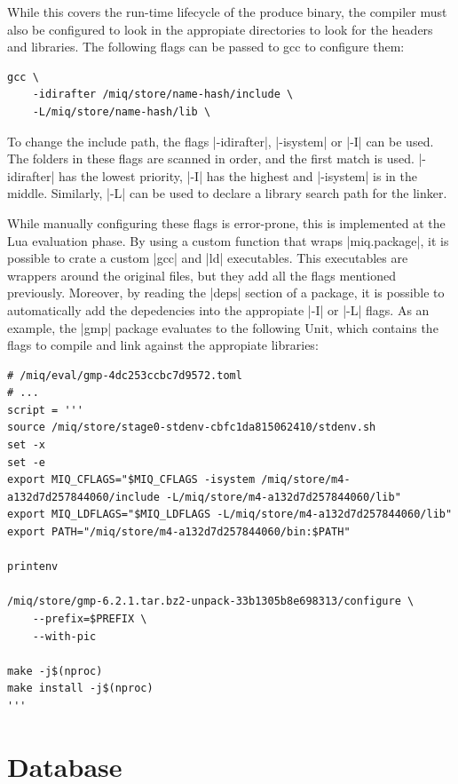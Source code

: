 While this covers the run-time lifecycle of the produce
binary, the compiler must also be configured to look in the
appropiate directories to look for the headers and
libraries. The following flags can be passed to gcc to
configure them:

\begin{verbatim}
gcc \
    -idirafter /miq/store/name-hash/include \
    -L/miq/store/name-hash/lib \
\end{verbatim}

To change the include path, the flags |-idirafter|,
|-isystem| or |-I| can be used. The folders in these flags
are scanned in order, and the first match is used.
|-idirafter| has the lowest priority, |-I| has the highest
and |-isystem| is in the middle.
Similarly, |-L| can be used to declare a library search path
for the linker.

While manually configuring these flags is error-prone, this
is implemented at the Lua evaluation phase. By using a
custom function that wraps |miq.package|, it is possible to
crate a custom |gcc| and |ld| executables. This executables
are wrappers around the original files, but they add all the
flags mentioned previously. Moreover, by reading the |deps|
section of a package, it is possible to automatically add
the depedencies into the appropiate |-I| or |-L| flags. As
an example, the |gmp| package evaluates to the following
Unit, which contains the flags to compile and link against
the appropiate libraries:

\begin{verbatim}
# /miq/eval/gmp-4dc253ccbc7d9572.toml
# ...
script = '''
source /miq/store/stage0-stdenv-cbfc1da815062410/stdenv.sh
set -x
set -e
export MIQ_CFLAGS="$MIQ_CFLAGS -isystem /miq/store/m4-a132d7d257844060/include -L/miq/store/m4-a132d7d257844060/lib"
export MIQ_LDFLAGS="$MIQ_LDFLAGS -L/miq/store/m4-a132d7d257844060/lib"
export PATH="/miq/store/m4-a132d7d257844060/bin:$PATH"

printenv

/miq/store/gmp-6.2.1.tar.bz2-unpack-33b1305b8e698313/configure \
    --prefix=$PREFIX \
    --with-pic

make -j$(nproc)
make install -j$(nproc)
'''

\end{verbatim}

\section{Database}
